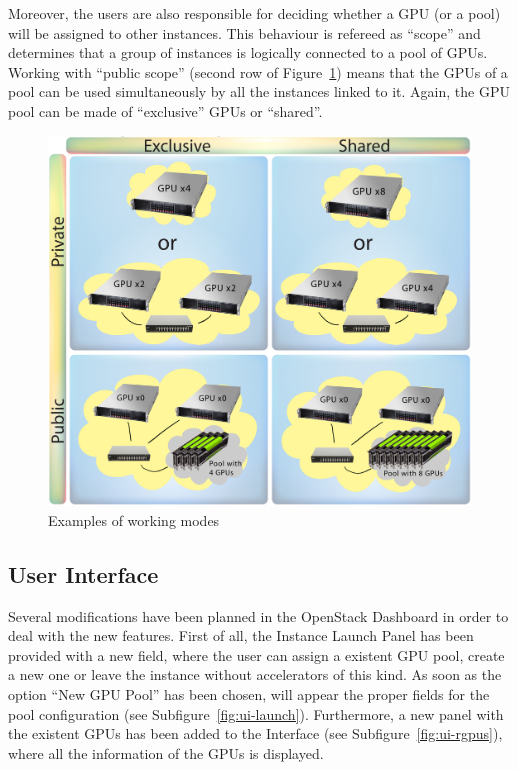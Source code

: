 \documentclass[a4paper,twoside]{article}
\begin{document}
Moreover, the users are also responsible for deciding whether a GPU (or a pool) will be assigned to other instances. 
This behaviour is refereed as ``scope'' and determines that a group of instances is logically connected to a pool of GPUs.
Working with ``public scope'' (second row of Figure~\ref{fig2}) means that the GPUs of a pool can be used simultaneously by all the instances linked to it.
Again, the GPU pool can be made of ``exclusive'' GPUs or ``shared''.

\begin{figure}[!t]
  \centering
  \includegraphics[width=.5\textwidth]{images/workingmodes.jpg}
  \caption{Examples of working modes}
  \label{fig2}
\end{figure}

\subsection{User Interface}
Several modifications have been planned in the OpenStack Dashboard in order to deal with the new features.
First of all, the Instance Launch Panel has been provided with a new field, where the user can assign a existent GPU pool, create a new one or leave the instance without accelerators of this kind.
As soon as the option ``New GPU Pool'' has been chosen, will appear the proper fields for the pool configuration (see Subfigure~\ref{fig:ui-launch}).
Furthermore, a new panel with the existent GPUs has been added to the Interface (see Subfigure~\ref{fig:ui-rgpus}), where all the information of the GPUs is displayed.
\end{document}

